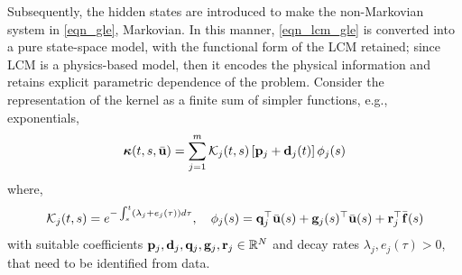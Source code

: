Subsequently, the hidden states are introduced to make the non-Markovian system in \cref{eqn_gle}, Markovian. In this manner, \cref{eqn_lcm_gle} is converted into a pure state-space model, with the functional form of the LCM retained; since LCM is a physics-based model, then it encodes the physical information and retains explicit parametric dependence of the problem. Consider the representation of the kernel as a finite sum of simpler functions, e.g., exponentials,
\begin{equation}
    \boldsymbol{\kappa}(t,s,\bar{\mathbf{u}}) = \sum_{j=1}^{m}\mathcal{K}_j(t,s)\left[\mathbf{p}_j + \mathbf{d}_j(t)\right]\phi_j(s)
\end{equation}
where,
\begin{equation}
    \mathcal{K}_j(t,s) = e^{-\int_{s}^{t}\left(\lambda_j + e_j(\tau)\right)d\tau},\quad \phi_j(s) = \mathbf{q}_j^{\top}\bar{\mathbf{u}}(s) + \mathbf{g}_j(s)^{\top}\bar{\mathbf{u}}(s) + \mathbf{r}_j^{\top}\bar{\mathbf{f}}(s)
\end{equation}
with suitable coefficients $\mathbf{p}_j,\mathbf{d}_j,\mathbf{q}_j,\mathbf{g}_j,\mathbf{r}_j\in\mathbb{R}^{N}$ and decay rates $\lambda_j,e_j(\tau)>0$, that need to be identified from data. 

